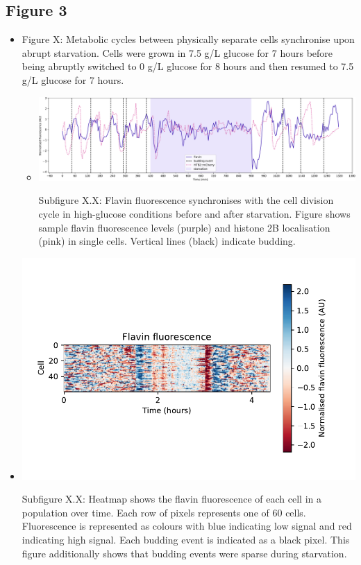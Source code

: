 \subsection{Figure 3}
\label{sec:org9b50c2e}
\begin{itemize}
\item Figure X: Metabolic cycles between physically separate cells synchronise upon abrupt starvation.  Cells were grown in 7.5 g/L glucose for 7 hours before being abruptly switched to 0 g/L glucose for 8 hours and then resumed to 7.5 g/L glucose for 7 hours.
\begin{itemize}
\item \begin{center}
\includegraphics[width=.9\linewidth]{starvation_single_birth_plot_new_edit.pdf}
\end{center} Subfigure X.X: Flavin fluorescence synchronises with the cell division cycle in high-glucose conditions before and after starvation.  Figure shows sample flavin fluorescence levels (purple) and histone 2B localisation (pink) in single cells.  Vertical lines (black) indicate budding.
\end{itemize}
\end{itemize}

\begin{itemize}
\item \begin{center}
\includegraphics[width=.9\linewidth]{fy4_19972_plots_butter_04.png}
\end{center} Subfigure X.X: Heatmap shows the flavin fluorescence of each cell in a population over time.  Each row of pixels represents one of 60 cells.  Fluorescence is represented as colours with blue indicating low signal and red indicating high signal.  Each budding event is indicated as a black pixel.  This figure additionally shows that budding events were sparse during starvation.
\end{itemize}

